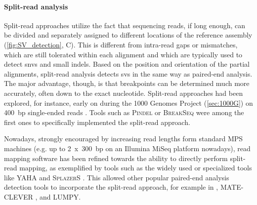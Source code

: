 \paragraph{Split-read analysis}
Split-read approaches utilize the fact that sequencing reads, if long enough,
can be divided and separately assigned to different locations of the
reference assembly  (\cref{fig:SV_detection}, C). This is different from intra-read
gaps or mismatches, which are still tolerated within each alignment and
which are typically used to detect \acp{snv} and small indels.
Based on the position and orientation of the partial alignments, split-read
analysis detects \acp{sv} in the same way as paired-end analysis. The major
advantage, though, is that breakpoints can be determined much more accurately,
often down to the exact nucleotide.
Split-read approaches had been explored, for instance, early on during the
1000 Genomes Project (\cref{sec:1000G}) on 400~bp single-ended reads
\citep{Zhang2011}. Tools such as \textsc{Pindel} \citep{Ye2009} or
\textsc{BreakSeq} \citep{Lam2010} were among the first ones to specifically
implemented the split-read approach.

Nowadays, strongly encouraged by increasing
read lengths form standard MPS machines (e.g. up to 2~x~300~bp on an Illumina
MiSeq platform nowadays), read mapping software has been refined towards the
ability to directly perform split-read mapping, as exemplified by tools such as
the widely used \bwamem or specialized tools like \textsc{YAHA}
\citep{Faust2012} and \textsc{SplazerS} \citep{Emde2012}.
This allowed other popular paired-end analysis detection tools to incorporate
the split-read approach, for example in \delly, \textsc{MATE-CLEVER}
\citep{Marschall2013}, and \textsc{LUMPY}.


